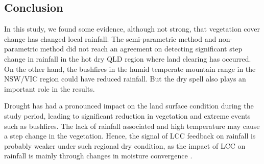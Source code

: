 \documentclass[draft,linenumbers]{agujournal}
\begin{document}
\begin{article}
\section{Conclusion}

In this study, we found some evidence, although not strong, that vegetation cover change has changed local rainfall. The semi-parametric method and non-parametric method did not reach an agreement on detecting significant step change in rainfall in the hot dry QLD region where land clearing has occurred. On the other hand, the bushfires in the humid temperate mountain range in the NSW/VIC region could have reduced rainfall. But the dry spell also plays an important role in the results. 

Drought has had a pronounced impact on the land surface condition during the study period, leading to significant reduction in vegetation and extreme events such as bushfires. The lack of rainfall associated and high temperature may cause a step change in the vegetation. Hence, the signal of LCC feedback on rainfall is probably weaker under such regional dry condition, as the impact of LCC on rainfall is mainly through changes in moisture convergence \citep{Gorgen2006,Pitman2007}.







\end{article}
\end{document}
